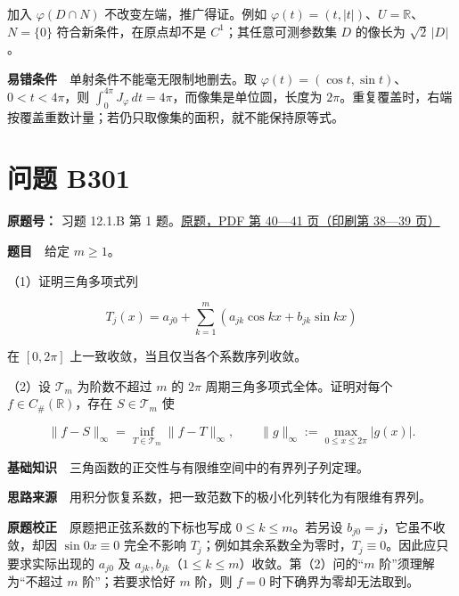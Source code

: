 \documentclass[11pt,a4paper]{article}
\begin{document}
加入 \(\varphi(D\cap N)\) 不改变左端，推广得证。例如
\(\varphi(t)=(t,|t|)\)、\(U=\mathbb R\)、\(N=\{0\}\)
符合新条件，在原点却不是 \(C^1\)；其任意可测参数集 \(D\) 的像长为
\(\sqrt2\,|D|\)。

\textbf{易错条件}　单射条件不能毫无限制地删去。取
\(\varphi(t)=(\cos t,\sin t)\)、\(0<t<4\pi\)，则
\(\int_0^{4\pi}J_\varphi\,dt=4\pi\)，而像集是单位圆，长度为
\(2\pi\)。重复覆盖时，右端按覆盖重数计量；若仍只取像集的面积，就不能保持原等式。

\section{问题 B301}\label{ux95eeux9898-b301}

\textbf{原题号：} 习题 12.1.B 第 1
题。\href{https://zj139.github.io/math-notes/files/problems/楼分析习题-v2.pdf\#page=40}{原题，PDF
第 40---41 页（印刷第 38---39 页）}

\textbf{题目}　给定 \(m\ge1\)。

（1）证明三角多项式列

\begin{equation}
T_j(x)=a_{j0}+\sum_{k=1}^m(a_{jk}\cos kx+b_{jk}\sin kx)
\tag{26}
\end{equation}

在 \([0,2\pi]\) 上一致收敛，当且仅当各个系数序列收敛。

（2）设 \(\mathcal T_m\) 为阶数不超过 \(m\) 的 \(2\pi\)
周期三角多项式全体。证明对每个 \(f\in C_\#(\mathbb R)\)，存在
\(S\in\mathcal T_m\) 使

\begin{equation}
\|f-S\|_\infty=\inf_{T\in\mathcal T_m}\|f-T\|_\infty,
\qquad \|g\|_\infty:=\max_{0\le x\le2\pi}|g(x)|.
\tag{27}
\end{equation}

\textbf{基础知识}　三角函数的正交性与有限维空间中的有界列子列定理。

\textbf{思路来源}　用积分恢复系数，把一致范数下的极小化列转化为有限维有界列。

\textbf{原题校正}　原题把正弦系数的下标也写成 \(0\le k\le m\)。若另设
\(b_{j0}=j\)，它虽不收敛，却因 \(\sin0x\equiv0\) 完全不影响
\(T_j\)；例如其余系数全为零时，\(T_j\equiv0\)。因此应只要求实际出现的
\(a_{j0}\) 及
\(a_{jk},b_{jk}\)（\(1\le k\le m\)）收敛。第（2）问的``\(m\)
阶''须理解为``不超过 \(m\) 阶''；若要求恰好 \(m\) 阶，则 \(f=0\)
时下确界为零却无法取到。
\end{document}
